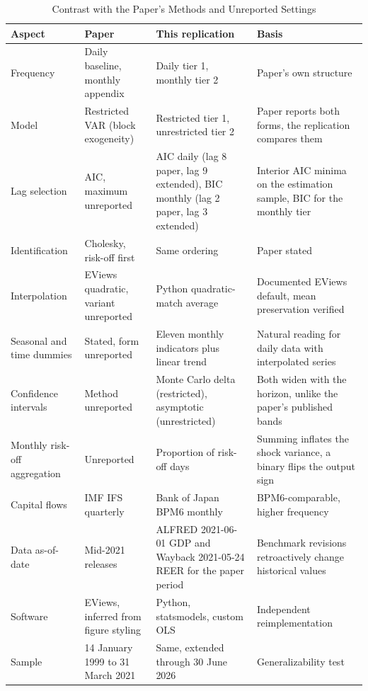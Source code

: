 \FloatBarrier
\begin{table}[H]
  \centering
  \caption{Contrast with the Paper's Methods and Unreported Settings}
  \label{tab:contrast}
  \small
  \begin{tabularx}{\textwidth}{@{}p{2.2cm} p{3.6cm} p{5.0cm} X@{}}
    \toprule
    Aspect & Paper & This replication & Basis \\
    \midrule
    Frequency & Daily baseline, monthly appendix & Daily tier 1, monthly tier 2 & Paper's own structure \\
    Model & Restricted VAR (block exogeneity) & Restricted tier 1, unrestricted tier 2 & Paper reports both forms, the replication compares them \\
    Lag selection & AIC, maximum unreported & AIC daily (lag 8 paper, lag 9 extended), BIC monthly (lag 2 paper, lag 3 extended) & Interior AIC minima on the estimation sample, BIC for the monthly tier \\
    Identification & Cholesky, risk-off first & Same ordering & Paper stated \\
    Interpolation & EViews quadratic, variant unreported & Python quadratic-match average & Documented EViews default, mean preservation verified \\
    Seasonal and time dummies & Stated, form unreported & Eleven monthly indicators plus linear trend & Natural reading for daily data with interpolated series \\
    Confidence intervals & Method unreported & Monte Carlo delta (restricted), asymptotic (unrestricted) & Both widen with the horizon, unlike the paper's published bands \\
    Monthly risk-off aggregation & Unreported & Proportion of risk-off days & Summing inflates the shock variance, a binary flips the output sign \\
    Capital flows & IMF IFS quarterly & Bank of Japan BPM6 monthly & BPM6-comparable, higher frequency \\
    Data as-of-date & Mid-2021 releases & ALFRED 2021-06-01 GDP and Wayback 2021-05-24 REER for the paper period & Benchmark revisions retroactively change historical values \\
    Software & EViews, inferred from figure styling & Python, statsmodels, custom OLS & Independent reimplementation \\
    Sample & 14 January 1999 to 31 March 2021 & Same, extended through 30 June 2026 & Generalizability test \\
    \bottomrule
  \end{tabularx}
\end{table}
\FloatBarrier

